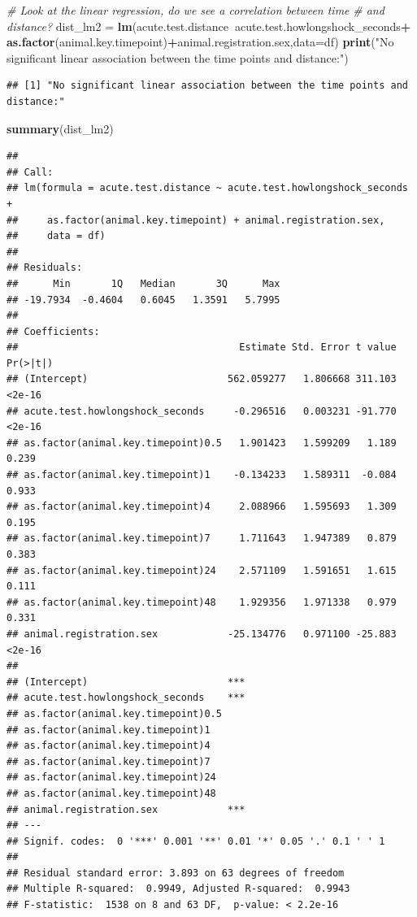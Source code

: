 \documentclass[]{article}
\newenvironment{Shaded}{\begin{snugshade}}{\end{snugshade}}
\newcommand{\KeywordTok}[1]{\textcolor[rgb]{0.13,0.29,0.53}{\textbf{#1}}}
\newcommand{\DataTypeTok}[1]{\textcolor[rgb]{0.13,0.29,0.53}{#1}}
\newcommand{\StringTok}[1]{\textcolor[rgb]{0.31,0.60,0.02}{#1}}
\newcommand{\CommentTok}[1]{\textcolor[rgb]{0.56,0.35,0.01}{\textit{#1}}}
\newcommand{\OperatorTok}[1]{\textcolor[rgb]{0.81,0.36,0.00}{\textbf{#1}}}
\newcommand{\NormalTok}[1]{#1}
\begin{document}
\begin{Shaded}
\begin{Highlighting}[]
\CommentTok{# Look at the linear regression, do we see a correlation between time}
\CommentTok{# and distance?}
\NormalTok{dist_lm2 =}\StringTok{ }\KeywordTok{lm}\NormalTok{(acute.test.distance}\OperatorTok{~}\NormalTok{acute.test.howlongshock_seconds}\OperatorTok{+}
\StringTok{                }\KeywordTok{as.factor}\NormalTok{(animal.key.timepoint)}\OperatorTok{+}\NormalTok{animal.registration.sex,}\DataTypeTok{data=}\NormalTok{df)}
\KeywordTok{print}\NormalTok{(}\StringTok{"No significant linear association between the time points and distance:"}\NormalTok{)}
\end{Highlighting}
\end{Shaded}

\begin{verbatim}
## [1] "No significant linear association between the time points and distance:"
\end{verbatim}

\begin{Shaded}
\begin{Highlighting}[]
\KeywordTok{summary}\NormalTok{(dist_lm2)}
\end{Highlighting}
\end{Shaded}

\begin{verbatim}
## 
## Call:
## lm(formula = acute.test.distance ~ acute.test.howlongshock_seconds + 
##     as.factor(animal.key.timepoint) + animal.registration.sex, 
##     data = df)
## 
## Residuals:
##      Min       1Q   Median       3Q      Max 
## -19.7934  -0.4604   0.6045   1.3591   5.7995 
## 
## Coefficients:
##                                      Estimate Std. Error t value Pr(>|t|)
## (Intercept)                        562.059277   1.806668 311.103   <2e-16
## acute.test.howlongshock_seconds     -0.296516   0.003231 -91.770   <2e-16
## as.factor(animal.key.timepoint)0.5   1.901423   1.599209   1.189    0.239
## as.factor(animal.key.timepoint)1    -0.134233   1.589311  -0.084    0.933
## as.factor(animal.key.timepoint)4     2.088966   1.595693   1.309    0.195
## as.factor(animal.key.timepoint)7     1.711643   1.947389   0.879    0.383
## as.factor(animal.key.timepoint)24    2.571109   1.591651   1.615    0.111
## as.factor(animal.key.timepoint)48    1.929356   1.971338   0.979    0.331
## animal.registration.sex            -25.134776   0.971100 -25.883   <2e-16
##                                       
## (Intercept)                        ***
## acute.test.howlongshock_seconds    ***
## as.factor(animal.key.timepoint)0.5    
## as.factor(animal.key.timepoint)1      
## as.factor(animal.key.timepoint)4      
## as.factor(animal.key.timepoint)7      
## as.factor(animal.key.timepoint)24     
## as.factor(animal.key.timepoint)48     
## animal.registration.sex            ***
## ---
## Signif. codes:  0 '***' 0.001 '**' 0.01 '*' 0.05 '.' 0.1 ' ' 1
## 
## Residual standard error: 3.893 on 63 degrees of freedom
## Multiple R-squared:  0.9949, Adjusted R-squared:  0.9943 
## F-statistic:  1538 on 8 and 63 DF,  p-value: < 2.2e-16
\end{verbatim}
\end{document}
